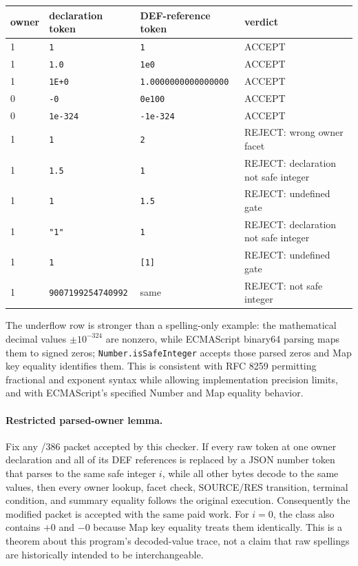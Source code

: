 \documentclass[11pt]{article}
\begin{document}
\begin{center}
\begin{tabular}{llll}
\toprule
owner & declaration token & DEF-reference token & verdict\\
\midrule
1 & \texttt{1} & \texttt{1} & ACCEPT\\
1 & \texttt{1.0} & \texttt{1e0} & ACCEPT\\
1 & \texttt{1E+0} & \texttt{1.0000000000000000} & ACCEPT\\
0 & \texttt{-0} & \texttt{0e100} & ACCEPT\\
0 & \texttt{1e-324} & \texttt{-1e-324} & ACCEPT\\
1 & \texttt{1} & \texttt{2} & REJECT: wrong owner facet\\
1 & \texttt{1.5} & \texttt{1} & REJECT: declaration not safe integer\\
1 & \texttt{1} & \texttt{1.5} & REJECT: undefined gate\\
1 & \texttt{"1"} & \texttt{1} & REJECT: declaration not safe integer\\
1 & \texttt{1} & \texttt{[1]} & REJECT: undefined gate\\
1 & \texttt{9007199254740992} & same & REJECT: not safe integer\\
\bottomrule
\end{tabular}
\end{center}

The underflow row is stronger than a spelling-only example: the mathematical
decimal values $\pm10^{-324}$ are nonzero, while ECMAScript binary64 parsing maps
them to signed zeros; \texttt{Number.isSafeInteger} accepts those parsed zeros and
Map key equality identifies them.  This is consistent with RFC 8259 permitting
fractional and exponent syntax while allowing implementation precision limits,
and with ECMAScript's specified Number and Map equality behavior.

\paragraph{Restricted parsed-owner lemma.}
Fix any /386 packet accepted by this checker.  If every raw token at one owner
declaration and all of its DEF references is replaced by a JSON number token
that parses to the same safe integer $i$, while all other bytes decode to the
same values, then every owner lookup, facet check, SOURCE/RES transition, terminal
condition, and summary equality follows the original execution.  Consequently
the modified packet is accepted with the same paid work.  For $i=0$, the class
also contains $+0$ and $-0$ because Map key equality treats them identically.
This is a theorem about this program's decoded-value trace, not a claim that raw
spellings are historically intended to be interchangeable.
\end{document}
